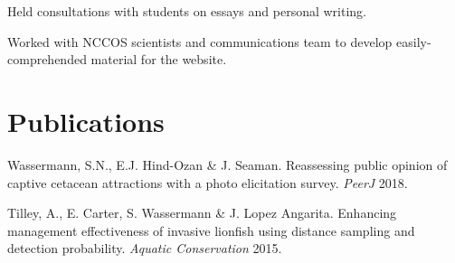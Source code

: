\documentclass[a4paper]{deedy-resume} %
\begin{document}
\begin{flushleft}

Held consultations with students on essays and personal writing.

\sectionspace %



Worked with NCCOS scientists and communications team to develop easily-comprehended material for the website.

\sectionspace 
\sectionspace



\section{Publications} 

\begin{tightitemize}
\item Wassermann, S.N., E.J. Hind-Ozan \& J. Seaman. 
Reassessing public opinion of captive cetacean attractions with a photo elicitation survey. \textit{PeerJ} 2018.
\item Tilley, A., E. Carter, S. Wassermann \& J. Lopez Angarita. Enhancing management effectiveness of invasive lionfish using distance sampling and detection probability. \textit{Aquatic Conservation} 2015.
\end{tightitemize}

\sectionspace


\end{flushleft}
\end{document}
